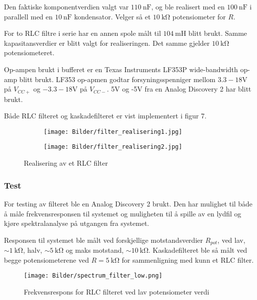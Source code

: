 Den faktiske komponentverdien valgt var $\SI{110}{\nano\farad}$, og ble realisert med en $\SI{100}{\nano\farad}$ i parallell med en $\SI{10}{\nano\farad}$ kondensator.
Velger så et $\SI{10}{\kilo\ohm}$ potensiometer for $R$.

For to RLC filtre i serie har en annen spole målt til $\SI{104}{\milli\henry}$ blitt brukt. Samme kapasitansverdier er blitt valgt for realiseringen. Det samme gjelder 
$\SI{10}{\kilo\ohm}$ potensiometeret.

Op-ampen brukt i bufferet er en Texas Instruments LF353P wide-bandwidth op-amp \cite{lf353_opamp} blitt brukt. LF353 op-apmen godtar forsyningsspenniger mellom 
$3.3-18$V på $V_{CC+}$ og $-3.3-18$V på $V_{CC-}$. 5V og -5V fra en Analog Discovery 2 har blitt brukt.

Både RLC filteret og kaskadefilteret er vist implementert i figur 7.

\begin{figure}[H]
    \begin{subfigure}[c]{.49\linewidth}
        \texttt{[image: Bilder/filter\_realisering1.jpg]}
    \end{subfigure}
    \hfill
    \begin{subfigure}[c]{.49\linewidth}
        \texttt{[image: Bilder/filter\_realisering2.jpg]}
    \end{subfigure}
    \caption{Realisering av et RLC filter}
\end{figure}

\subsubsection{Test}
For testing av filteret ble en Analog Discovery 2 brukt. Den har mulighet til både å måle frekvensresponsen til systemet og muligheten til å spille av en lydfil og 
kjøre spektralanalyse på utgangen fra systemet.

Responsen til systemet ble målt ved forskjellige motstandsverdier $R_{pot}$, ved lav, $\sim \SI{1}{\kilo\ohm}$, halv, $\sim \SI{5}{\kilo\ohm}$ og maks motstand, $\sim \SI{10}{\kilo\ohm}$.
Kaskadefilteret ble så målt ved begge potensiometerene ved $R = \SI{5}{\kilo\ohm}$ for sammenligning med kunn et RLC filter.
\begin{figure}[H]
    \centering
    \texttt{[image: Bilder/spectrum\_filter\_low.png]}
    \caption{Frekvensrespons for RLC filteret ved lav potensiometer verdi}
\end{figure}

